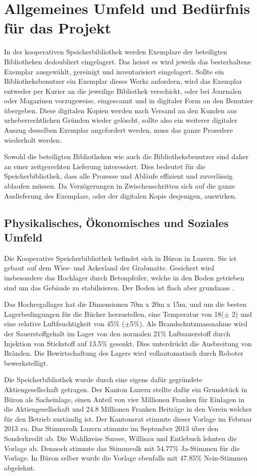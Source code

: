 \chapter{Allgemeines Umfeld und Bedürfnis für das Projekt}
In der kooperativen Speicherbibliothek werden Exemplare der beteiligten Bibliotheken dedoubliert eingelagert. Das heisst es wird jeweils das besterhaltene Exemplar ausgewählt, gereinigt und inventarisiert eingelagert. Sollte ein Bibliotheksbenutzer ein Exemplar dieses Werks anfordern, wird das Exemplar entweder per Kurier an die jeweilige Bibliothek verschickt, oder bei Journalen oder Magazinen vorzugsweise, eingescannt und in digitaler Form an den Benutzer übergeben. Diese digitalen Kopien werden nach Versand an den Kunden aus urheberrechtlichen Gründen wieder gelöscht, sollte also ein weiterer digitaler Auszug desselben Exemplar angefordert werden, muss das ganze Prozedere wiederholt werden.

Sowohl die beteiligten Bibliotheken wie auch die Bibliotheksbenutzer sind daher an einer zeitgerechten Lieferung interessiert. Dies bedeutet für die Speicherbibliothek, dass alle Prozesse und Abläufe effizient und zuverlässig ablaufen müssen. Da Verzögerungen in Zwischenschritten sich auf die ganze Auslieferung des Exemplars, oder der digitalen Kopie desjenigen, auswirken.

\section{Physikalisches, Ökonomisches und Soziales Umfeld}
Die Kooperative Speicherbibliothek befindet sich in Büron in Luzern. Sie ist gebaut auf dem Wies- und Ackerland der Grabmatte. Gesichert wird insbesondere das Hochlager durch Betonpfeiler, welche in den Boden getrieben sind um das Gebäude zu stabilisieren. Der Boden ist flach aber grundnass \parencite{GeoMapAdmin2019}.

Das Hochregallager hat die Dimensionen 70m x 20m x 15m, und um die besten Lagerbedingungen für die Bücher herzustellen, eine Temperatur von 18\SIUnitSymbolDegree ($\pm$ 2) und eine relative Luftfeuchtigkeit von 45\% ($\pm$5\%). Als Brandschutzmassnahme wird der Sauerstoffgehalt im Lager von den normalen 21\% Luftsauerstoff durch Injektion von Stickstoff auf 13.5\% gesenkt. Dies unterdrückt die Ausbreitung von Bränden.
Die Bewirtschaftung des Lagers wird vollautomatisch durch Roboter bewerkstelligt.

Die Speicherbibliothek wurde durch eine eigens dafür gegründete Aktiengesellschaft getragen. Der Kanton Luzern stellte dafür ein Grundstück in Büron als Sacheinlage, einen Anteil von vier Millionen Franken für Einlagen in die Aktiengesellschaft und 24.8 Millionen Franken Beiträge in den Verein welcher für den Betrieb zuständig ist. Der Kantonsrat stimmte dieser Vorlage im Februar 2013 zu. Das Stimmvolk Luzern stimmte im September 2013 über den Sonderkredit ab. 
Die Wahlkreise Sursee, Willisau und Entlebuch lehnten die Vorlage ab. Dennoch stimmte das Stimmvolk mit 54.77\% Ja-Stimmen für die Vorlage. In Büron selber wurde die Vorlage ebenfalls mit 47.85\% Nein-Stimmen abgelehnt.

